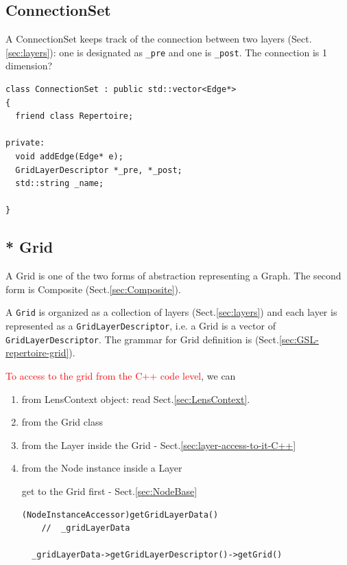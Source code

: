 \subsection{ ConnectionSet}
\label{sec:ConnectionSet}

A ConnectionSet keeps track of the connection between two layers
(Sect.\ref{sec:layers}): one is designated as \verb!_pre! and one is
\verb!_post!.  The connection is 1 dimension?

\begin{verbatim}
class ConnectionSet : public std::vector<Edge*>
{
  friend class Repertoire;
  
private:
  void addEdge(Edge* e);
  GridLayerDescriptor *_pre, *_post;
  std::string _name;
  
}
\end{verbatim}


\subsection{* Grid}
\label{sec:Grid}

A Grid is one of the two forms of abstraction representing a Graph. The second
form is Composite (Sect.\ref{sec:Composite}).

A \verb!Grid! is organized as a collection of layers (Sect.\ref{sec:layers})
and each layer is represented as a \verb!GridLayerDescriptor!, i.e. a Grid is a
vector of \verb!GridLayerDescriptor!. 
The grammar for Grid definition
is (Sect.\ref{sec:GSL-repertoire-grid}).


\textcolor{red}{To access to the grid from the C++ code level}, we can 
\begin{enumerate}
  \item from LensContext object:  read Sect.\ref{sec:LensContext}.
  
  \item from the Grid class
  
  \item from the Layer inside the Grid - Sect.\ref{sec:layer-access-to-it-C++}
  
  \item from the Node instance inside a Layer

get to the Grid first - Sect.\ref{sec:NodeBase}  
\begin{verbatim}
(NodeInstanceAccessor)getGridLayerData()
	//  _gridLayerData
  
  _gridLayerData->getGridLayerDescriptor()->getGrid()
\end{verbatim}

\end{enumerate}

